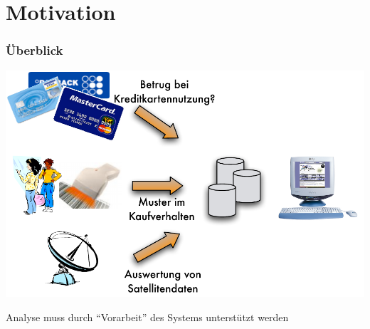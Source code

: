 

\section{Motivation}


\begin{frame}
\frametitle{Überblick}

\begin{center}
\includegraphics[scale=.5]{fig1/motivation.pdf}
\end{center}


Analyse muss durch "`Vorarbeit"' des Systems unterstützt werden

\end{frame}


